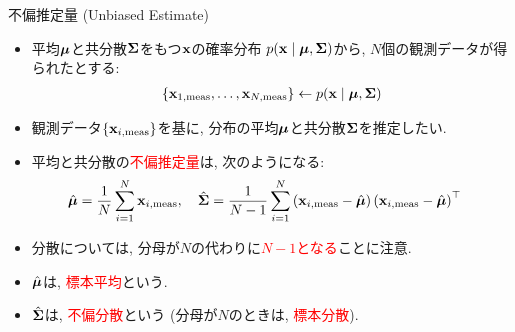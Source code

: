 \documentclass[dvipdfmx,notheorems,t]{beamer}
\begin{document}
\begin{frame}{不偏推定量 (Unbiased Estimate)}
\begin{itemize}
  \item 平均$\vb*{\mu}$と共分散$\vb{\Sigma}$をもつ$\vb{x}$の確率分布
  $p(\vb{x} \mid \vb*{\mu}, \vb{\Sigma})$から, $N$個の観測データが得られたとする:
  \begin{align*}
    \left\{ \vb{x}_{1, \mathrm{meas}}, \ldots, \vb{x}_{N, \mathrm{meas}} \right\}
      \gets p(\vb{x} \mid \vb*{\mu}, \vb{\Sigma})
  \end{align*}
  \item 観測データ$\{ \vb{x}_{i, \mathrm{meas}} \}$を基に,
  分布の平均$\vb*{\mu}$と共分散$\vb{\Sigma}$を推定したい.
  \item 平均と共分散の\textcolor{red}{不偏推定量}は, 次のようになる:
  \begin{align*}
    \hat{\vb*{\mu}} &= \frac{1}{N} \sum_{i = 1}^N \vb{x}_{i, \mathrm{meas}}, \quad
    \hat{\vb{\Sigma}} = \frac{1}{N - 1} \sum_{i = 1}^N
      \left( \vb{x}_{i, \mathrm{meas}} - \hat{\vb*{\mu}} \right)
      \left( \vb{x}_{i, \mathrm{meas}} - \hat{\vb*{\mu}} \right)^\top
  \end{align*}
  \item 分散については, 分母が$N$の代わりに\textcolor{red}{$N - 1$となる}ことに注意.
  \item $\hat{\vb*{\mu}}$は, \textcolor{red}{標本平均}という.
  \item $\hat{\vb{\Sigma}}$は, \textcolor{red}{不偏分散}という (分母が$N$のときは, \textcolor{red}{標本分散}).
\end{itemize}
\end{frame}
\end{document}
